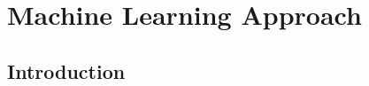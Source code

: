 \addchapheadtotoc
\chapter{Machine Learning Approach}\label{chapter:machineLearning}

\section{Introduction}